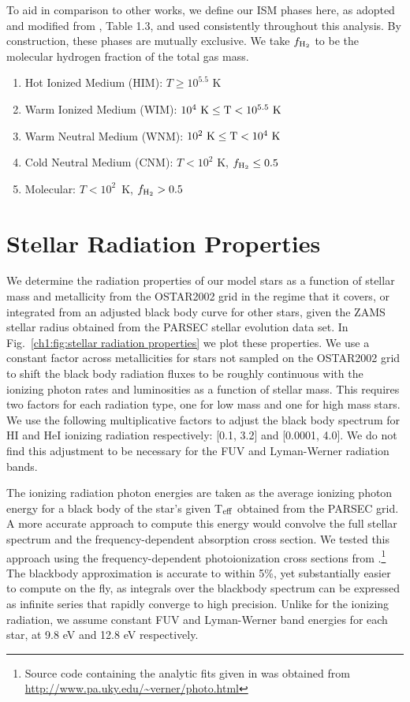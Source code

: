To aid in comparison to other works, we define our ISM phases here, as adopted and modified from \citet{Draine2011}, Table 1.3, and used consistently throughout this analysis. By construction, these phases are mutually exclusive. We take $f_{\rm H_2}$ to be the molecular hydrogen fraction of the total gas mass.

\begin{enumerate}
\item Hot Ionized Medium (HIM): $T \geq 10^{5.5}$ K
\item Warm Ionized Medium (WIM): $10^{4}~\rm{K} \leq T < 10^{5.5}~\rm{K} $
\item Warm Neutral Medium (WNM): $10^{2}~\rm{K} \leq T < 10^{4}~ \rm{K}$
\item Cold Neutral Medium (CNM): $T < 10^2$ K, $f_{\rm H_2} \leq 0.5$
\item Molecular: $T < 10^2$~K, $f_{\rm H_2} > 0.5$
\end{enumerate}

\section{Stellar Radiation Properties}
\label{appendix:radiation}
We determine the radiation properties of our model stars as a function of stellar mass and metallicity from the OSTAR2002 grid \citep{Lanz2003} in the regime that it covers, or integrated from an adjusted black body curve for other stars, given the ZAMS stellar radius obtained from the PARSEC \citep{Bressan2012,Tang2014} stellar evolution data set. In Fig.~\ref{ch1:fig:stellar radiation properties} we plot these properties. We use a constant factor across metallicities for stars not sampled on the OSTAR2002 grid to shift the black body radiation fluxes to be roughly continuous with the ionizing photon rates and luminosities as a function of stellar mass. This requires two factors for each radiation type, one for low mass and one for high mass stars. We use the following multiplicative factors to adjust the black body spectrum for HI and HeI ionizing radiation respectively: [0.1, 3.2] and [0.0001, 4.0]. We do not find this adjustment to be necessary for the FUV and Lyman-Werner radiation bands.

The ionizing radiation photon energies are taken as the average ionizing photon energy for a black body of the star's given T$_{\rm eff}$ obtained from the PARSEC grid. A more accurate approach to compute this energy would convolve the full stellar spectrum and the frequency-dependent absorption cross section. We tested this approach using the frequency-dependent photoionization cross sections from \citet{1996ApJ...465..487V}.\footnote{Source code containing the analytic fits given in \citet{1996ApJ...465..487V} was obtained from \url{http://www.pa.uky.edu/~verner/photo.html}}
The blackbody approximation is accurate to within 5\%, yet substantially easier to compute on the fly, as integrals over the blackbody spectrum can be expressed as infinite series that rapidly converge to high precision. Unlike for the ionizing radiation, we assume constant FUV and Lyman-Werner band energies for each star, at 9.8 eV and 12.8 eV respectively.


